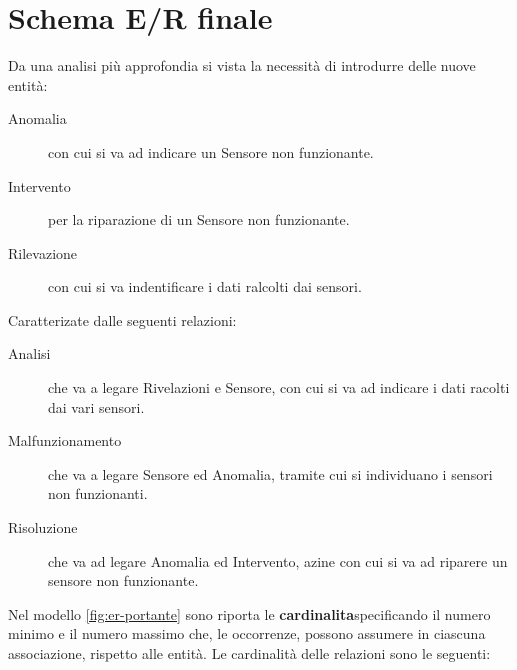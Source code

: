 \section{Schema E/R finale}
Da una analisi più approfondia si vista la necessità di introdurre delle nuove entità:
\begin{description}
\item [Anomalia] con cui si va ad indicare un Sensore non funzionante.
\item [Intervento] per la riparazione di un Sensore non funzionante.
\item [Rilevazione] con cui si va indentificare i dati ralcolti dai sensori.
\end{description}
Caratterizate dalle seguenti relazioni:
\begin{description}
\item [Analisi] che va a legare Rivelazioni e Sensore, con cui si va ad indicare i dati racolti dai vari sensori.
\item [Malfunzionamento] che va a legare Sensore ed Anomalia, tramite cui si individuano i sensori non funzionanti.
\item [Risoluzione] che va ad legare Anomalia ed Intervento, azine con cui si va ad riparere un sensore non funzionante.
\end{description}
Nel modello \ref{fig:er-portante} sono riporta le \textbf{cardinalita}specificando il numero minimo e il numero massimo che, le occorrenze, possono assumere in ciascuna associazione, rispetto alle entità. Le cardinalità delle relazioni sono le seguenti: 
